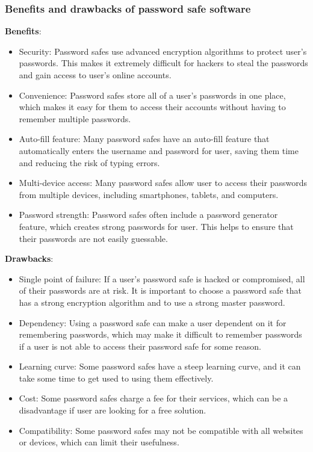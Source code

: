 \documentclass[conference]{IEEEtran}
\begin{document}
\subsubsection{Benefits and drawbacks of password safe software}
\textbf{Benefits}:
\begin{itemize}
\item Security: Password safes use advanced encryption algorithms to protect user's passwords. This makes it extremely difficult for hackers to steal the passwords and gain access to user's online accounts.
\item Convenience: Password safes store all of a user's passwords in one place, which makes it easy for them to access their accounts without having to remember multiple passwords.
\item Auto-fill feature: Many password safes have an auto-fill feature that automatically enters the username and password for user, saving them time and reducing the risk of typing errors.
\item Multi-device access: Many password safes allow user to access their passwords from multiple devices, including smartphones, tablets, and computers.
\item Password strength: Password safes often include a password generator feature, which creates strong passwords for user. This helps to ensure that their passwords are not easily guessable.
\end{itemize}
\textbf{Drawbacks}:
\begin{itemize}
\item Single point of failure: If a user's password safe is hacked or compromised, all of their passwords are at risk. It is important to choose a password safe that has a strong encryption algorithm and to use a strong master password.
\item Dependency: Using a password safe can make a user dependent on it for remembering passwords, which may make it difficult to remember passwords if a user is not able to access their password safe for some reason.
\item Learning curve: Some password safes have a steep learning curve, and it can take some time to get used to using them effectively.
\item Cost: Some password safes charge a fee for their services, which can be a disadvantage if user are looking for a free solution.
\item Compatibility: Some password safes may not be compatible with all websites or devices, which can limit their usefulness.
\end{itemize}
\end{document}
